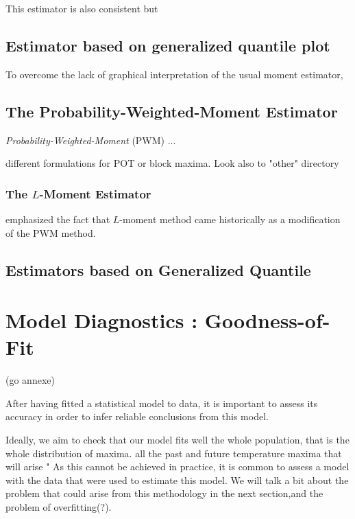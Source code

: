 \documentclass[11pt,a4paper,openany ]{book}
\begin{document}
This estimator is also consistent but  


\subsection*{Estimator based on generalized quantile plot}

To overcome the lack of graphical interpretation of the usual moment estimator, 




\subsection{The Probability-Weighted-Moment Estimator}

\emph{Probability-Weighted-Moment} (PWM)
...

different formulations for POT or block maxima. Look also to "other" directory
\cite{ribereau_skew_2016}


\subsubsection*{The $L$-Moment Estimator}
\cite{wang_lh_1997}

\cite{hosking_regional_1997} emphasized the fact that $L$-moment method came historically as a modification of the PWM method. 

\subsection{Estimators based on Generalized Quantile }




\section{Model Diagnostics : Goodness-of-Fit} (go annexe)

After having fitted a statistical model to data, it is important to assess its accuracy in order to infer reliable conclusions from this model.

Ideally, we aim to check that our model fits well the whole population, that is the whole distribution of maxima. all the past and future temperature maxima that will arise " As this cannot be achieved in practice, it is common to assess a model with the data that were used to estimate this model. We will talk a bit about the problem that could arise from this methodology in the next section,and the problem of overfitting(?).
\end{document}
